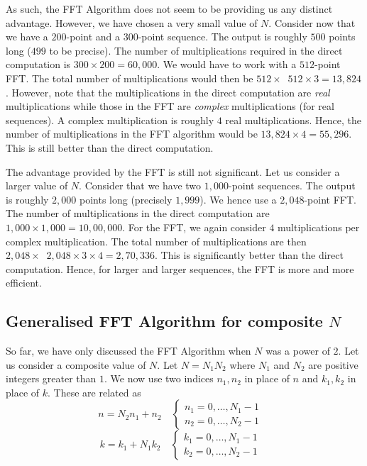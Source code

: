 \documentclass{article}
\theoremstyle{definition}
\newcommand*{\logtwo}{\mathop{\log_{2}}}
\begin{document}
As such, the FFT Algorithm does not seem to be providing us any distinct advantage. However, we have chosen a very small value of $N$. Consider now that we have a $200$-point and a $300$-point sequence. The output is roughly $500$ points long ($499$ to be precise). The number of multiplications required in the direct computation is $300 \times 200 = 60,000$. We would have to work with a $512$-point FFT. The total number of multiplications would then be $512 \times \logtwo 512 \times 3 = 13,824$. However, note that the multiplications in the direct computation are \textit{real} multiplications while those in the FFT are \textit{complex} multiplications (for real sequences). A complex multiplication is roughly $4$ real multiplications. Hence, the number of multiplications in the FFT algorithm would be $13,824 \times 4 = 55,296$. This is still better than the direct computation. \medskip

The advantage provided by the FFT is still not significant. Let us consider a larger value of $N$. Consider that we have two $1,000$-point sequences. The output is roughly $2,000$ points long (precisely $1,999$). We hence use a $2,048$-point FFT. The number of multiplications in the direct computation are $1,000 \times 1,000 = 10,00,000$. For the FFT, we again consider $4$ multiplications per complex multiplication. The total number of multiplications are then $2,048 \times \logtwo 2,048 \times 3 \times 4 = 2,70,336$. This is significantly better than the direct computation. Hence, for larger and larger sequences, the FFT is more and more efficient.

\subsection{Generalised FFT Algorithm for composite $N$}

So far, we have only discussed the FFT Algorithm when $N$ was a power of $2$. Let us consider a composite value of $N$. Let $N= N_1 N_2$ where $N_1$ and $N_2$ are positive integers greater than $1$. We now use two indices $n_1,n_2$ in place of $n$ and $k_1,k_2$ in place of $k$. These are related as
\[
    n = N_2 n_1 + n_2 \quad
    \begin{cases}
        n_1 = 0, \ldots , N_1 - 1 & \\
        n_2 = 0, \ldots , N_2 - 1 
    \end{cases}
\]
\[
    k = k_1 + N_1 k_2 \quad
    \begin{cases}
        k_1 = 0, \ldots , N_1 - 1 & \\
        k_2 = 0, \ldots , N_2 - 1 
    \end{cases}
\]
\end{document}
